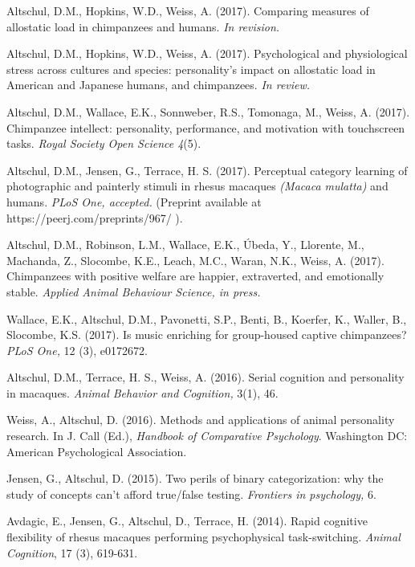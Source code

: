 \documentclass[margin,line]{res}
\begin{document}
\begin{resume}
Altschul, D.M., Hopkins, W.D., Weiss, A. (2017). Comparing measures of allostatic load in chimpanzees and humans. {\it In revision.}


Altschul, D.M., Hopkins, W.D., Weiss, A. (2017). Psychological and physiological stress across cultures and species: personality's impact on allostatic load in American and Japanese humans, and chimpanzees. {\it In review.} 

Altschul, D.M., Wallace, E.K., Sonnweber, R.S., Tomonaga, M., Weiss, A. (2017). Chimpanzee intellect: personality, performance, and motivation with touchscreen tasks. {\it Royal Society Open Science 4}(5).

Altschul, D.M., Jensen, G.,  Terrace, H. S. (2017). Perceptual category learning of photographic and painterly stimuli in rhesus macaques {\it (Macaca mulatta)} and humans.  {\it PLoS One, accepted.} (Preprint available at https://peerj.com/preprints/967/ ).

\vspace{0.7cm}

Altschul, D.M., Robinson, L.M., Wallace, E.K., \'{U}beda, Y., Llorente, M., Machanda, Z., Slocombe, K.E., Leach, M.C., Waran, N.K., Weiss, A. (2017). Chimpanzees with positive welfare are happier, extraverted, and emotionally stable. {\it Applied Animal Behaviour Science, in press.}

Wallace, E.K., Altschul, D.M., Pavonetti, S.P., Benti, B., Koerfer, K., Waller, B., Slocombe, K.S. (2017). Is music enriching for group-housed captive chimpanzees?  {\it PLoS One,} 12 (3), e0172672.

Altschul, D.M., Terrace, H. S., Weiss, A. (2016). Serial cognition and personality in macaques. {\it Animal Behavior and Cognition,} 3(1), 46.

Weiss, A., Altschul, D. (2016). Methods and applications of animal personality research. In J. Call (Ed.), {\it Handbook of Comparative Psychology}. Washington DC: American Psychological Association.

Jensen, G., Altschul, D. (2015). Two perils of binary categorization: why the study of concepts can't afford true/false testing. {\it Frontiers in psychology,} 6.

Avdagic, E., Jensen, G., Altschul, D., Terrace, H. (2014). Rapid cognitive flexibility of rhesus macaques performing psychophysical task-switching. {\it Animal Cognition}, 17 (3), 619-631.


\end{resume}
\end{document}
